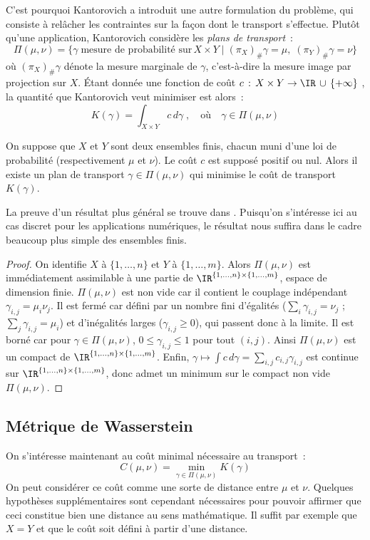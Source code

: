 C'est pourquoi Kantorovich a introduit une autre formulation du problème, qui consiste à relâcher les contraintes sur la façon dont le transport s'effectue. Plutôt qu'une application, Kantorovich considère les \emph{plans de transport}~:
\[\Pi(\mu,\nu) = \{\gamma\;\text{mesure de probabilité sur}\,X\times Y\;|\;(\pi_X)_\# \gamma = \mu,\; (\pi_Y)_\# \gamma = \nu\}\]
où $(\pi_X)_\# \gamma$ dénote la mesure marginale de $\gamma$, c'est-à-dire la mesure image par projection sur $X$. \' Etant donnée une fonction de coût $c\, : \, X\times Y \rightarrow \IR\,\cup\,\{+\infty\}$ , la quantité que Kantorovich veut minimiser est alors~:
\begin{equation}
\label{eq:kantorovich}
K(\gamma) = \int_{X\times Y} c\,d\gamma \; ,\quad \text{où} \quad \gamma \in \Pi(\mu,\nu)
\end{equation}
\begin{theoreme}
On suppose que $X$ et $Y$ sont deux ensembles finis, chacun muni d'une loi de probabilité (respectivement $\mu$ et $\nu$). Le coût $c$ est supposé positif ou nul. Alors il existe un plan de transport $\gamma \in \Pi(\mu,\nu)$ qui minimise le coût de transport $K(\gamma)$.
\end{theoreme}
La preuve d'un résultat plus général se trouve dans \cite{villani08}. Puisqu'on s'intéresse ici au cas discret pour les applications numériques, le résultat nous suffira dans le cadre beaucoup plus simple des ensembles finis.
\begin{proof}
On identifie $X$ à $\{1,\ldots,n\}$ et $Y$ à $\{1,\ldots,m\}$. Alors $\Pi(\mu,\nu)$ est immédiatement assimilable à une partie de $\IR^{\{1,\ldots,n\}\times\{1,\ldots,m\}}$, espace de dimension finie. $\Pi(\mu,\nu)$ est non vide car il contient le couplage indépendant $\gamma_{i,j} = \mu_i \nu_j$. Il est fermé car défini par un nombre fini d'égalités ($\sum_i \gamma_{i,j} = \nu_j$ ; $\sum_j \gamma_{i,j} = \mu_i$) et d'inégalités larges ($\gamma_{i,j} \ge 0$), qui passent donc à la limite. Il est borné car pour $\gamma \in \Pi(\mu,\nu)$, $0 \le \gamma_{i,j} \le 1$ pour tout $(i,j)$. Ainsi $\Pi(\mu,\nu)$ est un compact de $\IR^{\{1,\ldots,n\}\times\{1,\ldots,m\}}$. Enfin, $\gamma \mapsto \int c\,d\gamma = \sum_{i,j} c_{i,j} \gamma_{i,j}$ est continue sur $\IR^{\{1,\ldots,n\}\times\{1,\ldots,m\}}$, donc admet un minimum sur le compact non vide $\Pi(\mu,\nu)$.
\end{proof}

\subsection{Métrique de Wasserstein}
On s'intéresse maintenant au coût minimal nécessaire au transport~:
\[C(\mu,\nu) = \min_{\gamma \in \Pi(\mu,\nu)} K(\gamma) \]
On peut considérer ce coût comme une sorte de distance entre $\mu$ et $\nu$. Quelques hypothèses supplémentaires sont cependant nécessaires pour pouvoir affirmer que ceci constitue bien une distance au sens mathématique. Il suffit par exemple que $X=Y$ et que le coût soit défini à partir d'une distance.

